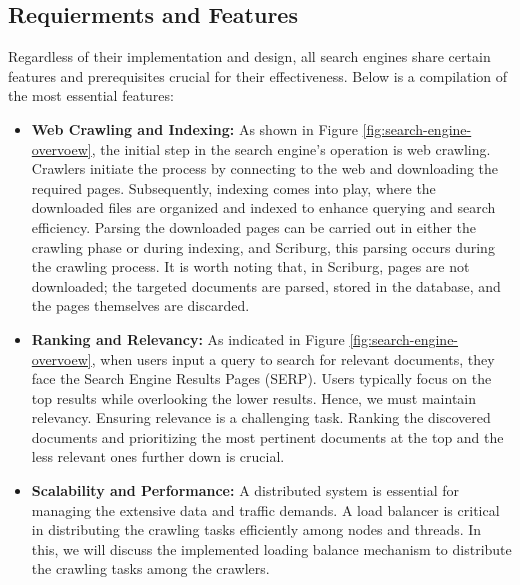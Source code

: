 \subsection{Requierments and Features}
Regardless of their implementation and design, all search engines share certain features and prerequisites crucial for their effectiveness. Below is a compilation of the most essential features: 

\begin{itemize}
	\item[] \textbf{Web Crawling and Indexing:} As shown in Figure \ref{fig:search-engine-overvoew}, the initial step in the search engine's operation is web crawling. Crawlers initiate the process by connecting to the web and downloading the required pages. Subsequently, indexing comes into play, where the downloaded files are organized and indexed to enhance querying and search efficiency. Parsing the downloaded pages can be carried out in either the crawling phase or during indexing, and Scriburg, this parsing occurs during the crawling process. It is worth noting that, in Scriburg, pages are not downloaded; the targeted documents are parsed, stored in the database, and the pages themselves are discarded.
  \item[] \textbf{Ranking and Relevancy:} As indicated in Figure \ref{fig:search-engine-overvoew}, when users input a query to search for relevant documents, they face the Search Engine Results Pages (SERP). Users typically focus on the top results while overlooking the lower results. Hence, we must maintain relevancy. Ensuring relevance is a challenging task. Ranking the discovered documents and prioritizing the most pertinent documents at the top and the less relevant ones further down is crucial. 
  \item[] \textbf{Scalability and Performance:} A distributed system is essential for managing the extensive data and traffic demands. A load balancer is critical in distributing the crawling tasks efficiently among nodes and threads. In this, we will discuss the implemented loading balance mechanism to distribute the crawling tasks among the crawlers. 

\end{itemize}

